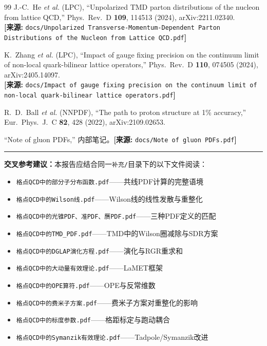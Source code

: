 \documentclass[12pt,a4paper]{ctexart}
\theoremstyle{definition}
\begin{document}
\begin{thebibliography}{99}
J.-C.~He \textit{et al.} (LPC),
``Unpolarized TMD parton distributions of the nucleon from lattice QCD,''
Phys.\ Rev.\ D \textbf{109}, 114513 (2024), arXiv:2211.02340.
\\\textbf{[来源:} \texttt{docs/Unpolarized Transverse-Momentum-Dependent Parton Distributions of the Nucleon from Lattice QCD.pdf}\textbf{]}

K.~Zhang \textit{et al.} (LPC),
``Impact of gauge fixing precision on the continuum limit of non-local quark-bilinear lattice operators,''
Phys.\ Rev.\ D \textbf{110}, 074505 (2024), arXiv:2405.14097.
\\\textbf{[来源:} \texttt{docs/Impact of gauge fixing precision on the continuum limit of non-local quark-bilinear lattice operators.pdf}\textbf{]}

R.~D.~Ball \textit{et al.} (NNPDF),
``The path to proton structure at 1\% accuracy,''
Eur.\ Phys.\ J.\ C \textbf{82}, 428 (2022), arXiv:2109.02653.

``Note of gluon PDFs,'' 内部笔记。\textbf{[来源:} \texttt{docs/Note of gluon PDFs.pdf}\textbf{]}

\end{thebibliography}

\vspace{0.5cm}
\noindent\rule{\textwidth}{0.5pt}
\small
\textbf{交叉参考建议：}本报告应结合同一\texttt{补充/}目录下的以下文件阅读：
\begin{itemize}[nosep]
    \item \texttt{格点QCD中的部分子分布函数.pdf}——共线PDF计算的完整语境
    \item \texttt{格点QCD中的Wilson线.pdf}——Wilson线的线性发散与重整化
    \item \texttt{格点QCD中的光锥PDF、准PDF、赝PDF.pdf}——三种PDF定义的匹配
    \item \texttt{格点QCD中的TMD\_PDF.pdf}——TMD中的Wilson圈减除与SDR方案
    \item \texttt{格点QCD中的DGLAP演化方程.pdf}——演化与RGR重求和
    \item \texttt{格点QCD中的大动量有效理论.pdf}——LaMET框架
    \item \texttt{格点QCD中的OPE算符.pdf}——OPE与反常维数
    \item \texttt{格点QCD中的费米子方案.pdf}——费米子方案对重整化的影响
    \item \texttt{格点QCD中的标度参数.pdf}——格距标定与跑动耦合
    \item \texttt{格点QCD中的Symanzik有效理论.pdf}——Tadpole/Symanzik改进
\end{itemize}
\end{document}
